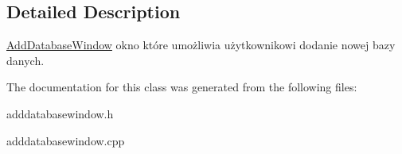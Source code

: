 \subsection{Detailed Description}
\mbox{\hyperlink{class_add_database_window}{Add\+Database\+Window}} okno które umożliwia użytkownikowi dodanie nowej bazy danych. 

The documentation for this class was generated from the following files\+:\begin{DoxyCompactItemize}
\item 
adddatabasewindow.\+h\item 
adddatabasewindow.\+cpp\end{DoxyCompactItemize}
